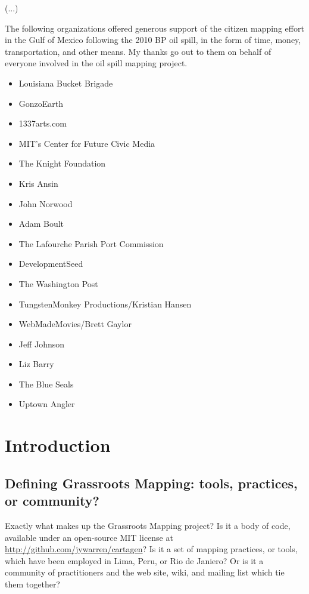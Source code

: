 \documentclass[11pt,oneside,notitlepage]{report}
\begin{document}
(...)

\label{sec:donors}

The following organizations offered generous support of the citizen mapping effort in the Gulf of Mexico following the 2010 BP oil spill, in the form of time, money, transportation, and other means. My thanks go out to them on behalf of everyone involved in the oil spill mapping project. 

\begin{itemize}
\item{Louisiana Bucket Brigade}
\item{GonzoEarth}
\item{1337arts.com}
\item{MIT's Center for Future Civic Media}
\item{The Knight Foundation}
\item{Kris Ansin}
\item{John Norwood}
\item{Adam Boult}
\item{The Lafourche Parish Port Commission}
\item{DevelopmentSeed}
\item{The Washington Post}
\item{TungstenMonkey Productions/Kristian Hansen}
\item{WebMadeMovies/Brett Gaylor}
\item{Jeff Johnson}
\item{Liz Barry}
\item{The Blue Seals}
\item{Uptown Angler}


\end{itemize}


\tableofcontents

\chapter{Introduction}

\section{Defining Grassroots Mapping: tools, practices, or community?}

Exactly what makes up the Grassroots Mapping project? Is it a body of code, available under an open-source MIT license at \url{http://github.com/jywarren/cartagen}? Is it a set of mapping practices, or tools, which have been employed in Lima, Peru, or Rio de Janiero? Or is it a community of practitioners and the web site, wiki, and mailing list which tie them together?
\end{document}
